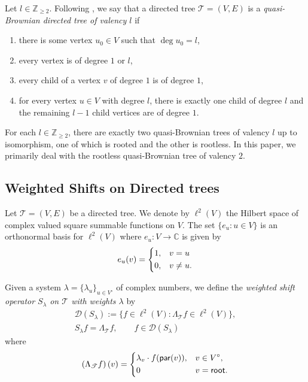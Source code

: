 \documentclass[11pt, reqno, a4paper]{amsart}
\theoremstyle{definition}
\newcommand{\scrD}{{\mathscr D}}
\newcommand{\scrT}{{\mathscr T}}
\renewcommand{\ge}{\geqslant}
\newcommand{\Z}{\mathbb Z}
\newcommand{\C}{\mathbb C}
\newcommand{\pr}{\mathsf{par}}
\numberwithin{equation}{section}
\begin{document}
    Let $l \in \Z_{\ge 2}$. Following \cite[Example 5.1]{MR4019095}, we say that a directed tree $\scrT = (V,E)$ is a \textit{quasi-Brownian directed tree of valency $l$} if
    \begin{enumerate}
        \item[\rm (i)] there is some vertex $u_0 \in V$ such that $\deg u_0 = l$,
        \item[\rm (ii)] every vertex is of degree $1$ or $l$,
        \item[\rm (iii)] every child of a vertex $v$ of degree $1$ is of degree $1$,
        \item[\rm (iv)] for every vertex $u \in V$ with degree $l$, there is exactly one child of degree $l$ and the remaining $l-1$ child vertices are of degree $1$. 
    \end{enumerate}

    For each $l \in \Z_{\ge 2}$, there are exactly two quasi-Brownian trees of valency $l$ up to isomorphism, one of which is rooted and the other is rootless. In this paper, we primarily deal with the rootless quasi-Brownian tree of valency $2$.


\subsection{Weighted Shifts on Directed trees}
Let $\scrT = ( V,  E)$ be a directed tree. We denote by $\ell ^2 ( V)$ the Hilbert space of complex valued square summable functions on $ V$. The set $\{ e_u : u \in  V \}$ is an orthonormal basis for $\ell ^2 ( V)$ where $e_u :  V \to \C$ is given by
\begin{equation*}
    e_u (v) = \begin{dcases}
        1, & v=u \\
        0, & v \ne u.
    \end{dcases}
\end{equation*}

Given a system $\lambda = \{ \lambda_{u} \}_{u \in  V ^{\circ}}$ of complex numbers, we define the \textit{weighted shift operator $S_{\lambda}$ on $\scrT$ with weights $\lambda$} by 
\begin{equation*}
\begin{gathered}
        \scrD (S_{\lambda}) := \{ f\in \ell ^2 ( V) : \Lambda_{\scrT} f \in \ell ^2 ( V) \}, \\
    S_{\lambda} f = \Lambda_{\scrT} f, \qquad f \in \scrD (S_{\lambda})
\end{gathered}
\end{equation*}
where 
\begin{equation*}
    \left( \Lambda_\scrT f \right) (v) = \begin{dcases}
        \lambda_v \cdot f(\pr (v)), & v\in  V ^{\circ}, \\
        0 & v=\mathsf{root}.
    \end{dcases}
\end{equation*}
\end{document}
